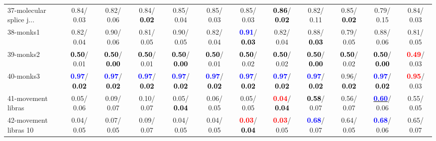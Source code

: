 \begin{table}[h]
\begin{center}
{\begin{tabular}{lc|c|c|c|c|c|c|c|c|c|c}
37-molecular splice j... &   0.84/  0.03 &   0.82/  0.06 &   0.84/\textcolor{black}{\textbf{  0.02}} &   0.85/  0.04 &   0.85/  0.03 &   0.85/  0.03 & \textcolor{black}{\textbf{  0.86}}/\textcolor{black}{\textbf{  0.02}} &   0.82/  0.11 &   0.85/\textcolor{black}{\textbf{  0.02}} &   0.79/  0.15 &   0.84/  0.03 \\
38-monks1 &   0.82/  0.04 &   0.90/  0.06 &   0.81/  0.05 &   0.90/  0.05 &   0.82/  0.04 & \textcolor{blue}{\textbf{  0.91}}/\textcolor{black}{\textbf{  0.03}} &   0.82/  0.04 &   0.88/\textcolor{black}{\textbf{  0.03}} &   0.79/  0.05 &   0.88/  0.06 &   0.81/  0.05 \\
39-monks2 & \textcolor{black}{\textbf{  0.50}}/  0.01 & \textcolor{black}{\textbf{  0.50}}/\textcolor{black}{\textbf{  0.00}} & \textcolor{black}{\textbf{  0.50}}/  0.01 & \textcolor{black}{\textbf{  0.50}}/\textcolor{black}{\textbf{  0.00}} & \textcolor{black}{\textbf{  0.50}}/  0.01 & \textcolor{black}{\textbf{  0.50}}/  0.02 & \textcolor{black}{\textbf{  0.50}}/  0.02 & \textcolor{black}{\textbf{  0.50}}/\textcolor{black}{\textbf{  0.00}} & \textcolor{black}{\textbf{  0.50}}/  0.02 & \textcolor{black}{\textbf{  0.50}}/\textcolor{black}{\textbf{  0.00}} & \textcolor{red}{\textbf{  0.49}}/  0.03 \\ \hline
40-monks3 & \textcolor{blue}{\textbf{  0.97}}/\textcolor{black}{\textbf{  0.02}} & \textcolor{blue}{\textbf{  0.97}}/\textcolor{black}{\textbf{  0.02}} & \textcolor{blue}{\textbf{  0.97}}/\textcolor{black}{\textbf{  0.02}} & \textcolor{blue}{\textbf{  0.97}}/\textcolor{black}{\textbf{  0.02}} & \textcolor{blue}{\textbf{  0.97}}/\textcolor{black}{\textbf{  0.02}} & \textcolor{blue}{\textbf{  0.97}}/\textcolor{black}{\textbf{  0.02}} & \textcolor{blue}{\textbf{  0.97}}/\textcolor{black}{\textbf{  0.02}} & \textcolor{blue}{\textbf{  0.97}}/\textcolor{black}{\textbf{  0.02}} &   0.96/\textcolor{black}{\textbf{  0.02}} & \textcolor{blue}{\textbf{  0.97}}/\textcolor{black}{\textbf{  0.02}} & \textcolor{red}{\textbf{  0.95}}/  0.03 \\
41-movement libras &   0.05/  0.06 &   0.09/  0.07 &   0.10/  0.07 &   0.05/\textcolor{black}{\textbf{  0.04}} &   0.06/  0.05 &   0.05/  0.05 & \textcolor{red}{\textbf{  0.04}}/\textcolor{black}{\textbf{  0.04}} & \textcolor{black}{\textbf{  0.58}}/  0.07 &   0.56/  0.07 & \underline{\textcolor{blue}{\textbf{  0.60}}}/  0.06 &   0.55/  0.05 \\
42-movement libras 10 &   0.04/  0.05 &   0.07/  0.05 &   0.09/  0.07 &   0.04/  0.05 &   0.04/  0.05 & \textcolor{red}{\textbf{  0.03}}/\textcolor{black}{\textbf{  0.04}} & \textcolor{red}{\textbf{  0.03}}/  0.05 & \textcolor{blue}{\textbf{  0.68}}/  0.07 &   0.64/  0.05 & \textcolor{blue}{\textbf{  0.68}}/  0.06 &   0.65/  0.07 \\

\end{tabular}}
\end{center}
\end{table}
